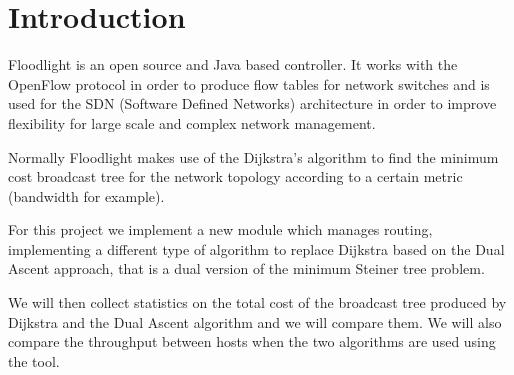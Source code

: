 \chapter{Introduction}\label{ch:intro}

Floodlight is an open source and Java based controller. It works with the
OpenFlow protocol in order to produce flow tables for network switches and is
used for the SDN (Software Defined Networks) architecture in order to improve
flexibility for large scale and complex network management.

Normally Floodlight makes use of the Dijkstra's algorithm to find the minimum
cost broadcast tree for the network topology according to a certain metric
(bandwidth for example).

For this project we implement a new module which manages routing, implementing a
different type of algorithm to replace Dijkstra based on the Dual Ascent
approach, that is a dual version of the minimum Steiner tree problem.

We will then collect statistics on the total cost of the broadcast tree produced
by Dijkstra and the Dual Ascent algorithm and we will compare them. We will also
compare the throughput between hosts when the two algorithms are used using the
 tool.
